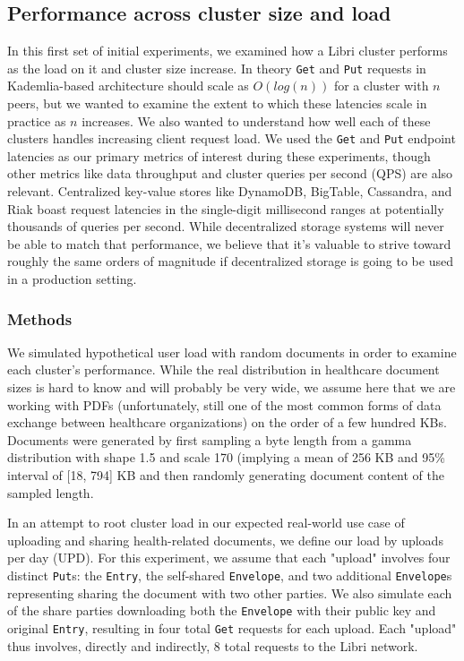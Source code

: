\documentclass[10pt]{article}
\newcommand{\ttt}[1]{\texttt{#1}}
\def\Entry{\ttt{Entry}}
\def\Envelope{\ttt{Envelope}}
\begin{document}
\subsection{Performance across cluster size and load}

In this first set of initial experiments, we examined how a Libri cluster performs as the load on it and cluster size increase. In theory \ttt{Get} and \texttt{Put} requests in Kademlia-based architecture should scale as $O(log(n))$ for a cluster with $n$ peers, but we wanted to examine the extent to which these latencies scale in practice as $n$ increases. We also wanted to understand how well each of these clusters handles increasing client request load. We used the \texttt{Get} and \texttt{Put} endpoint latencies as our primary metrics of interest during these experiments, though other metrics like data throughput and cluster queries per second (QPS) are also relevant. Centralized key-value stores like DynamoDB, BigTable, Cassandra, and Riak boast request latencies in the single-digit millisecond ranges at potentially thousands of queries per second. While decentralized storage systems will never be able to match that performance, we believe that it's valuable to strive toward roughly the same orders of magnitude if decentralized storage is going to be used in a production setting. 

\subsubsection{Methods}
We simulated hypothetical user load with random documents in order to examine each cluster's performance. While the real distribution in healthcare document sizes is hard to know and will probably be very wide, we assume here that we are working with PDFs (unfortunately, still one of the most common forms of data exchange between healthcare organizations) on the order of a few hundred KBs. Documents were generated by first sampling a byte length from a gamma distribution with shape 1.5 and scale 170 (implying a mean of 256 KB and 95\% interval of [18, 794] KB and then randomly generating document content of the sampled length.

In an attempt to root cluster load in our expected real-world use case of uploading and sharing health-related documents, we define our load by uploads per day (UPD). For this experiment, we assume that each "upload" involves four distinct \ttt{Put}s: the \Entry{}, the self-shared \Envelope{}, and two additional \Envelope{}s representing sharing the document with two other parties. We also simulate each of the share parties downloading both the \Envelope{} with their public key and original \Entry{}, resulting in four total \texttt{Get} requests for each upload. Each "upload" thus involves, directly and indirectly, 8 total requests to the Libri network. 
\end{document}
